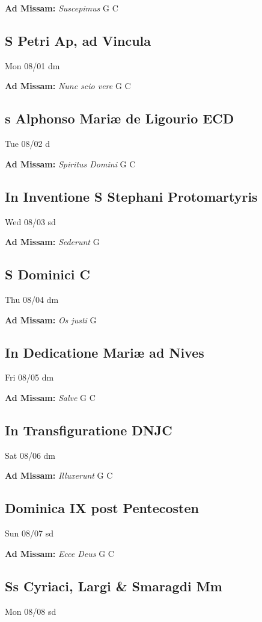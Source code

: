 \documentclass[letterpaper, 10pt, twocolumn]{article}
\begin{document}
\textbf{Ad Missam:} \textit{Suscepimus} G C 

\subsection*{S Petri Ap, ad Vincula}Mon 08/01 dm

\textbf{Ad Missam:} \textit{Nunc scio vere} G C 

\subsection*{s Alphonso Mariæ de Ligourio ECD}Tue 08/02 d

\textbf{Ad Missam:} \textit{Spiritus Domini} G C 

\subsection*{In Inventione S Stephani Protomartyris}Wed 08/03 sd

\textbf{Ad Missam:} \textit{Sederunt} G 

\subsection*{S Dominici C}Thu 08/04 dm

\textbf{Ad Missam:} \textit{Os justi} G 

\subsection*{In Dedicatione Mariæ ad Nives}Fri 08/05 dm

\textbf{Ad Missam:} \textit{Salve} G C 

\subsection*{In Transfiguratione DNJC}Sat 08/06 dm

\textbf{Ad Missam:} \textit{Illuxerunt} G C 

\subsection*{Dominica IX post Pentecosten}Sun 08/07 sd

\textbf{Ad Missam:} \textit{Ecce Deus} G C 

\subsection*{Ss Cyriaci, Largi \& Smaragdi Mm}Mon 08/08 sd
\end{document}
